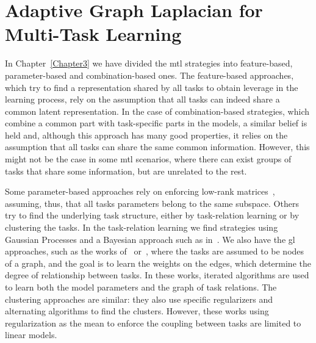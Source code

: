 
\chapter{Adaptive Graph Laplacian for Multi-Task Learning} %
\label{Chapter5}

{\bf \small{

    }}

In Chapter~\ref{Chapter3} we have divided the \acrfull{mtl} strategies into feature-based, parameter-based and combination-based ones.
The feature-based approaches, which try to find a representation shared by all tasks to obtain leverage in the learning process, rely on the assumption that all tasks can indeed share a common latent representation.
In the case of combination-based strategies, which combine a common part with task-specific parts in the models, a similar belief is held and, although this approach has many good properties, it relies on the assumption that all tasks can share the same common information.
However, this might not be the case in some \acrshort{mtl} scenarios, where there can exist groups of tasks that share some information, but are unrelated to the rest.

%
%
Some parameter-based approaches rely on enforcing low-rank matrices~\citep{AndoZ05,ChenTLY09,PongTJY10}, assuming, thus, that all tasks parameters belong to the same subspace.
Others try to find the underlying task structure, either by task-relation learning or by clustering the tasks. In the task-relation learning we find strategies using Gaussian Processes and a Bayesian approach such as in~\citet{BonillaCW07,ZhangY10}. We also have the \acrfull{gl} approaches, such as the works of~\citet{EvgeniouMP05} or~\citet{argyriou2013learning}, where the tasks are assumed to be nodes of a graph, and the goal is to learn the weights on the edges, which determine the degree of relationship between tasks.
In these works, iterated algorithms are used to learn both the model parameters and the graph of task relations.
The clustering approaches are similar: they also use specific regularizers and alternating algorithms to find the clusters.
However, these works using regularization as the mean to enforce the coupling between tasks are limited to linear models.

